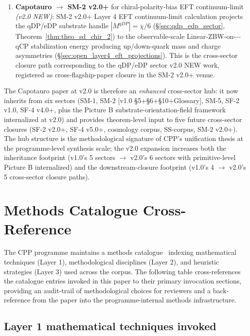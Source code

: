 \documentclass[11pt,letterpaper]{article}
\begin{document}
\begin{enumerate}
    \item \textbf{Capotauro $\to$ SM-2 v2.0+} for chiral-polarity-bias EFT continuum-limit \emph{(v2.0 NEW)}: SM-2 v2.0+ Layer 4 EFT continuum-limit calculation projects the qDP/eDP substrate handle $|M^{qDP}| = \chi/6$ (\S\ref{sec:qdp_edp_sector}, Theorem~\ref{thm:theo_sd_chir_2}) to the observable-scale Linear-ZBW-on-$-$qCP stabilization energy producing up/down-quark mass and charge asymmetries (\S\ref{sec:open_layer4_eft_projections}). This is the cross-sector closure path corresponding to the qDP/eDP sector v2.0 NEW work, registered as cross-flagship-paper closure in the SM-2 v2.0+ venue.
\end{enumerate}

The Capotauro paper at v2.0 is therefore an \emph{enhanced} cross-sector hub: it now inherits from six sectors (SM-1, SM-2 [v1.0 \S5+\S6+\S10+Glossary], SM-5, SF-2 v1.0, SF-4 v4.0+, plus the Picture B substrate-orientation-field framework internalized at v2.0) and provides theorem-level input to five future cross-sector closures (SF-2 v2.0+, SF-4 v5.0+, cosmology corpus, SS-corpus, SM-2 v2.0+). The hub structure is the methodological signature of CPP's unification thesis at the programme-level synthesis scale; the v2.0 expansion increases both the inheritance footprint (v1.0's 5 sectors $\to$ v2.0's 6 sectors with primitive-level Picture B internalized) and the downstream-closure footprint (v1.0's 4 $\to$ v2.0's 5 cross-sector closure paths).

\section{Methods Catalogue Cross-Reference}\label{sec:methods_catalogue_xref}

The CPP programme maintains a methods catalogue~\cite{abshier_methods_catalogue} indexing mathematical techniques (Layer 1), methodological disciplines (Layer 2), and heuristic strategies (Layer 3) used across the corpus. The following table cross-references the catalogue entries invoked in this paper to their primary invocation sections, providing an audit-trail of methodological choices for reviewers and a back-reference from the paper into the programme-internal methods infrastructure.

\subsection{Layer 1 mathematical techniques invoked}\label{sec:meth_l1_xref}
\end{document}
